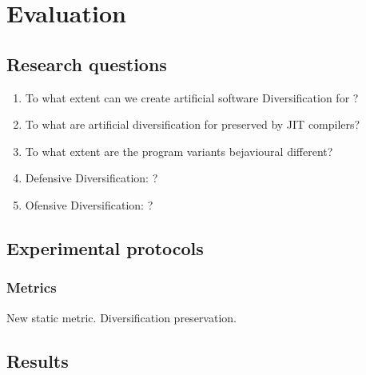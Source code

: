 \chapter{Evaluation}
\label{method}


\newcommand{\rqone}{To what extent can we create artificial software Diversification for \Wasm?}
\newcommand{\rqtwo}{To what are artificial diversification for \Wasm preserved by JIT compilers?}
\newcommand{\rqthree}{To what extent are the \Wasm program variants bejavioural different?}
\newcommand{\rqfour}{Defensive Diversification: ?}
\newcommand{\rqfive}{Ofensive Diversification: ?}

\section{Research questions}

\begin{enumerate}[label=RQ\arabic*:, ref=RQ\arabic*]
	\item \rqone
	\item \rqtwo
	\item \rqthree
	\item \rqfour
	\item \rqfive
\end{enumerate}

\section{Experimental protocols}

\subsection{Metrics}

New static metric. Diversification preservation.

\section{Results}
